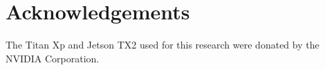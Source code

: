 \section*{Acknowledgements} \label{acknowledge}
The Titan Xp and Jetson TX2 used for this research were donated by the
NVIDIA Corporation.
